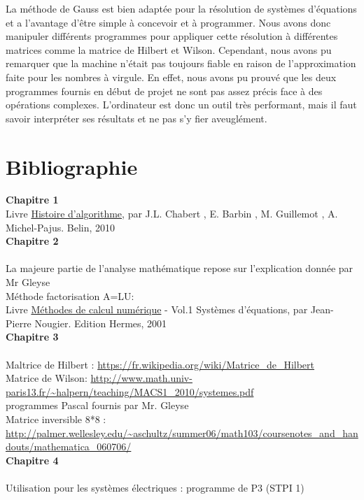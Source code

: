 \documentclass[a4paper,12pt]{report}
\begin{document}
La méthode de Gauss est bien adaptée pour la résolution de systèmes d'équations et a l'avantage d'être simple à concevoir et à programmer. Nous avons donc manipuler différents programmes pour appliquer cette résolution à différentes matrices comme la matrice de Hilbert et Wilson. Cependant, nous avons pu remarquer que la machine n'était pas toujours fiable en raison de l'approximation faite pour les nombres à virgule. En effet, nous avons pu prouvé que les deux programmes fournis en début de projet ne sont pas assez précis face à des opérations complexes. L'ordinateur est donc un outil très performant, mais il faut savoir interpréter ses résultats et ne pas s'y fier aveuglément.  \\
\chapter*{Bibliographie}


\textbf{Chapitre 1}\\
Livre \underline{Histoire d'algorithme}, par J.L. Chabert , E. Barbin , M. Guillemot , A. Michel-Pajus. Belin, 2010
\\

\textbf{Chapitre 2}\\
\\
La majeure partie de l’analyse mathématique repose sur l’explication donnée par Mr Gleyse\\

Méthode factorisation A=LU:\\ 
Livre \underline{Méthodes de calcul numérique} - Vol.1 Systèmes d'équations, par Jean-Pierre Nougier. Edition Hermes, 2001\\

\textbf{Chapitre 3}\\
\\
Maltrice de Hilbert : \url{https://fr.wikipedia.org/wiki/Matrice_de_Hilbert}\\
Matrice de Wilson: \url{http://www.math.univ-paris13.fr/~halpern/teaching/MACS1_2010/systemes.pdf}\\
programmes Pascal fournis par Mr. Gleyse\\
Matrice inversible 8*8 : \url{http://palmer.wellesley.edu/~aschultz/summer06/math103/coursenotes_and_handouts/mathematica_060706/}\\


\textbf{Chapitre 4}\\
\\
Utilisation pour les systèmes électriques : programme de P3 (STPI 1)
\end{document}
